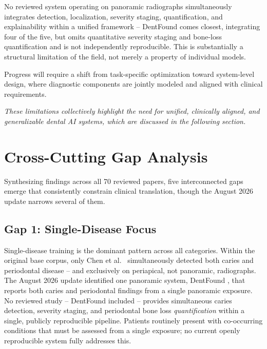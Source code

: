 \documentclass[conference]{IEEEtran}
\begin{document}
No reviewed system operating on panoramic radiographs simultaneously
integrates detection, localization, severity staging, quantification,
and explainability within a unified framework -- DentFound
\cite{zhu2026dentfound} comes closest, integrating four of the five,
but omits quantitative severity staging and bone-loss quantification
and is not independently reproducible. This is substantially a
structural limitation of the field, not merely a property of
individual models.

Progress will require a shift from task-specific optimization toward
system-level design, where diagnostic components are jointly modeled and
aligned with clinical requirements.

\vspace{4pt}
\noindent\textit{These limitations collectively highlight the need for
unified, clinically aligned, and generalizable dental AI systems, which
are discussed in the following section.}

\section{Cross-Cutting Gap Analysis}
\label{sec:gaps}

Synthesizing findings across all 70 reviewed papers, five
interconnected gaps emerge that consistently constrain clinical
translation, though the August 2026 update narrows several of them.

\subsection{Gap 1: Single-Disease Focus}

Single-disease training is the dominant pattern across all categories.
Within the original base corpus, only Chen et al.~\cite{chen2023deep}
simultaneously detected both caries and periodontal disease -- and
exclusively on periapical, not panoramic, radiographs. The August 2026
update identified one panoramic system, DentFound
\cite{zhu2026dentfound}, that reports both caries and periodontal
findings from a single panoramic exposure. No reviewed study --
DentFound included -- provides simultaneous caries detection,
severity staging, and periodontal bone loss \emph{quantification}
within a single, publicly reproducible pipeline. Patients routinely
present with co-occurring conditions that must be assessed from a
single exposure; no current openly reproducible system fully addresses
this.
\end{document}
